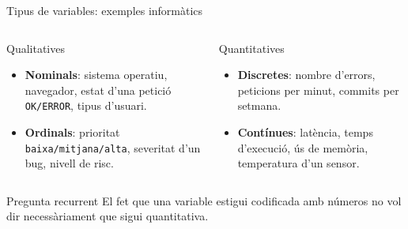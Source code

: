 \documentclass[10pt,aspectratio=169]{beamer}
\newcommand{\important}[1]{\textcolor{UABGreen}{\textbf{#1}}}
\begin{document}
\begin{frame}{Tipus de variables: exemples informàtics}
\begin{columns}[T]
\begin{block}{Qualitatives}
\begin{itemize}
  \item \important{Nominals}: sistema operatiu, navegador, estat d'una petició \texttt{OK/ERROR}, tipus d'usuari.
  \item \important{Ordinals}: prioritat \texttt{baixa/mitjana/alta}, severitat d'un bug, nivell de risc.
\end{itemize}
\end{block}
\begin{block}{Quantitatives}
\begin{itemize}
  \item \important{Discretes}: nombre d'errors, peticions per minut, commits per setmana.
  \item \important{Contínues}: latència, temps d'execució, ús de memòria, temperatura d'un sensor.
\end{itemize}
\end{block}
\end{columns}
\vspace{0.35cm}
\begin{alertblock}{Pregunta recurrent}
El fet que una variable estigui codificada amb números no vol dir necessàriament que sigui quantitativa.
\end{alertblock}
\end{frame}
\end{document}
